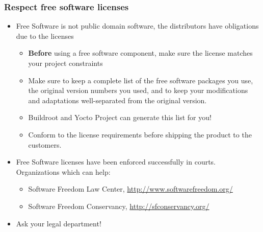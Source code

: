 \begin{frame}
  \frametitle{Respect free software licenses}
  \begin{itemize}
  \item Free Software is not public domain software, the distributors
    have obligations due to the licenses
    \begin{itemize}
    \item {\bf Before} using a free software component, make sure the
      license matches your project constraints
    \item Make sure to keep a complete list of the free software
      packages you use, the original version numbers you used, and to
      keep your modifications and adaptations well-separated from
      the original version.
    \item Buildroot and Yocto Project can generate this list for you!
    \item Conform to the license requirements before shipping the
      product to the customers.
    \end{itemize}
  \item Free Software licenses have been enforced successfully in
    courts. Organizations which can help:
    \begin{itemize}
    \item Software Freedom Law Center, \url{http://www.softwarefreedom.org/}
    \item Software Freedom Conservancy, \url{http://sfconservancy.org/}
    \end{itemize}
  \item Ask your legal department!
  \end{itemize}
\end{frame}

